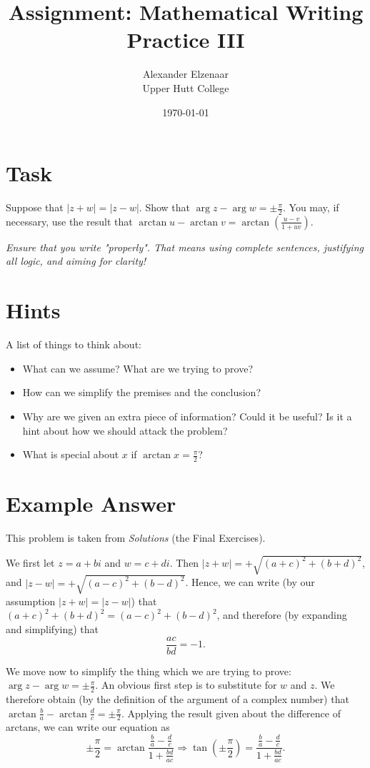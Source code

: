 \documentclass[a4paper]{article}
\author{Alexander Elzenaar\\Upper Hutt College}
\date{\today}
\title{Assignment: Mathematical Writing Practice III}
\begin{document}
\maketitle

\section{Task}
Suppose that $ | z+w | = | z-w | $. Show that $ \arg z - \arg w = \pm \frac{\pi}{2} $. You
may, if necessary, use the result that $ \arctan u - \arctan v = \arctan\left(\frac{u-v}{1+uv} \right) $.

\textit{Ensure that you write "properly". That means using complete sentences, justifying
all logic, and aiming for clarity!}

\section{Hints}
A list of things to think about:
\begin{itemize}
  \item What can we assume? What are we trying to prove?
  \item How can we simplify the premises and the conclusion?
  \item Why are we given an extra piece of information? Could
        it be useful? Is it a hint about how we should attack the problem?
  \item What is special about $ x $ if $ \arctan x = \frac{\pi}{2} $?
\end{itemize}

\newpage
\section{Example Answer}
This problem is taken from \textit{Solutions} (the Final Exercises).

We first let $ z = a + bi $ and $ w = c + di $. Then $ | z + w | = +\sqrt{(a+c)^2 + (b+d)^2} $,
and $ | z - w | = +\sqrt{(a-c)^2 + (b-d)^2} $. Hence, we can write (by our assumption
$ | z+w | = | z-w | $) that $ (a+c)^2 + (b+d)^2 = (a-c)^2 + (b-d)^2 $, and therefore (by expanding
and simplifying) that
\begin{equation}
  \frac{ac}{bd} = -1.
\end{equation}

We move now to simplify the thing which we are trying to prove: $ \arg z - \arg w = \pm \frac{\pi}{2} $. An
obvious first step is to substitute for $ w $ and $ z $. We therefore obtain (by the definition of the argument
of a complex number) that $ \arctan \frac{b}{a} - \arctan \frac{d}{c} = \pm\frac{\pi}{2} $. Applying the result
given about the difference of arctans, we can write our equation as
\begin{equation}
  \pm\frac{\pi}{2} = \arctan \frac{\frac{b}{a} - \frac{d}{c}}{1 + \frac{bd}{ac}} \Rightarrow \tan\left(\pm\frac{\pi}{2}\right) = \frac{\frac{b}{a} - \frac{d}{c}}{1 + \frac{bd}{ac}}.
\end{equation}
\end{document}
